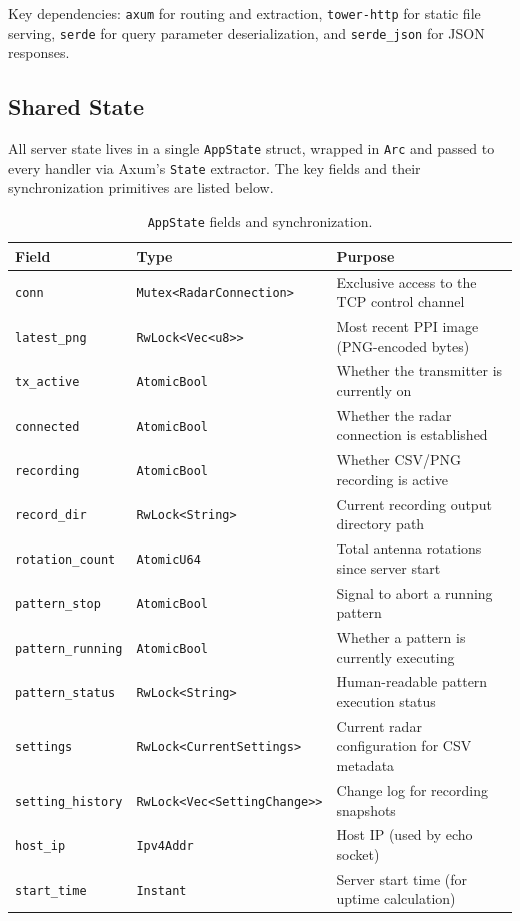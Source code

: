 \documentclass[11pt,letterpaper]{article}
\begin{document}
Key dependencies: \texttt{axum} for routing and extraction, \texttt{tower-http} for static file serving, \texttt{serde} for query parameter deserialization, and \texttt{serde\_json} for JSON responses.

\subsection{Shared State}
\label{subsec:appstate}

All server state lives in a single \texttt{AppState} struct, wrapped in \texttt{Arc} and passed to every handler via Axum's \texttt{State} extractor. The key fields and their synchronization primitives are listed below.

\begin{table}[H]
\centering
\begin{tabularx}{\textwidth}{l l X}
\toprule
\textbf{Field} & \textbf{Type} & \textbf{Purpose} \\
\midrule
\texttt{conn} & \texttt{Mutex<RadarConnection>} & Exclusive access to the TCP control channel \\
\texttt{latest\_png} & \texttt{RwLock<Vec<u8>{}>} & Most recent PPI image (PNG-encoded bytes) \\
\texttt{tx\_active} & \texttt{AtomicBool} & Whether the transmitter is currently on \\
\texttt{connected} & \texttt{AtomicBool} & Whether the radar connection is established \\
\texttt{recording} & \texttt{AtomicBool} & Whether CSV/PNG recording is active \\
\texttt{record\_dir} & \texttt{RwLock<String>} & Current recording output directory path \\
\texttt{rotation\_count} & \texttt{AtomicU64} & Total antenna rotations since server start \\
\texttt{pattern\_stop} & \texttt{AtomicBool} & Signal to abort a running pattern \\
\texttt{pattern\_running} & \texttt{AtomicBool} & Whether a pattern is currently executing \\
\texttt{pattern\_status} & \texttt{RwLock<String>} & Human-readable pattern execution status \\
\texttt{settings} & \texttt{RwLock<CurrentSettings>} & Current radar configuration for CSV metadata \\
\texttt{setting\_history} & \texttt{RwLock<Vec<SettingChange>{}>} & Change log for recording snapshots \\
\texttt{host\_ip} & \texttt{Ipv4Addr} & Host IP (used by echo socket) \\
\texttt{start\_time} & \texttt{Instant} & Server start time (for uptime calculation) \\
\bottomrule
\end{tabularx}
\caption{\texttt{AppState} fields and synchronization.}
\label{tab:appstate}
\end{table}
\end{document}
